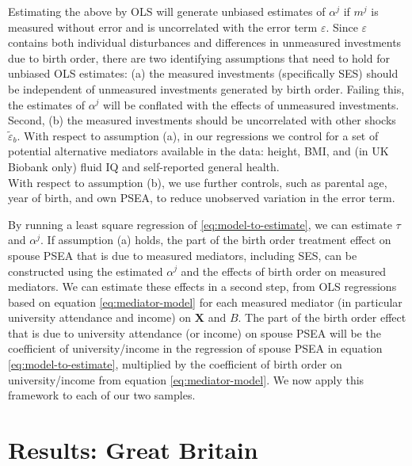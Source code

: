 \documentclass[
  12pt,
]{article}
\theoremstyle{definition}
\theoremstyle{definition}
\theoremstyle{definition}
\theoremstyle{definition}
\theoremstyle{remark}
\begin{document}
Estimating the above by OLS will generate unbiased estimates of
\(\alpha^j\) if \(m^j\) is measured without error and is
uncorrelated with the error term \(\varepsilon\). Since
\(\varepsilon\) contains both individual disturbances and differences
in unmeasured investments due to birth order, there are two identifying assumptions that need to hold for unbiased OLS estimates: (a) the measured investments
(specifically SES) should be independent of unmeasured investments
generated by birth order. Failing this, the estimates of \(\alpha^j\) will be
conflated with the effects of unmeasured investments. Second, (b) the measured
investments should be uncorrelated with other shocks \(\tilde{\varepsilon}_b\).
With respect to assumption (a), in our regressions we control for a set of
potential alternative mediators available in the data: height,
BMI, and (in UK Biobank only) fluid IQ and self-reported general health.\\
With respect to assumption (b), we use further controls, such as parental age,
year of birth, and own PSEA, to reduce unobserved variation in the error term.

By running a least square regression of \eqref{eq:model-to-estimate}, we can
estimate \(\tau\) and \(\alpha^j\). If assumption (a) holds, the part of the birth
order treatment effect on spouse PSEA that is due to measured mediators,
including SES, can be constructed using the estimated \(\alpha^j\) and the effects
of birth order on measured mediators. We can estimate these effects in a second
step, from OLS regressions based on equation \eqref{eq:mediator-model} for each
measured mediator (in particular university attendance and income) on
\(\mathbf{X}\) and \(B\). The part of the birth order effect that is due to
university attendance (or income) on spouse PSEA will be the coefficient of
university/income in the regression of spouse PSEA in equation
\eqref{eq:model-to-estimate}, multiplied by the coefficient of birth order on
university/income from equation \eqref{eq:mediator-model}. We now apply this
framework to each of our two samples.

\hypertarget{results-great-britain}{%
\section{Results: Great Britain}\label{results-great-britain}}

 
  \providecommand{\huxb}[2]{\arrayrulecolor[RGB]{#1}\global\arrayrulewidth=#2pt}
  \providecommand{\huxvb}[2]{\color[RGB]{#1}\vrule width #2pt}
  \providecommand{\huxtpad}[1]{\rule{0pt}{#1}}
  \providecommand{\huxbpad}[1]{\rule[-#1]{0pt}{#1}}
\end{document}

